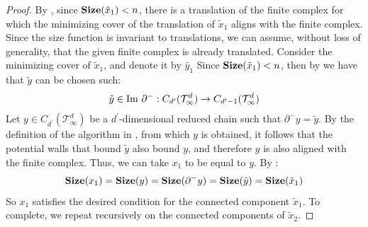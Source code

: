 \begin{proof}
By , since $\mathbf{Size}(\tilde{x}_{1}) < n$, there is a translation of the finite complex for which the minimizing cover of the translation of $\tilde{x}_{1}$ aligns with the finite complex. Since the size function is invariant to translations, we can assume, without loss of generality, that the given finite complex is already translated. Consider the minimizing cover of $\tilde{x}_{1}$, and denote it by $\tilde{y_1}$ Since $\mathbf{Size}(\tilde{x}_{1}) < n$, then by  we have that $\tilde{y}$ can be chosen such:
\begin{equation*}
  \begin{split}
    \tilde{y} \in \text{Im } \partial^{-} : C_{d^{\prime}}(\mathcal T_\infty^d) \rightarrow C_{d^{\prime}-1}(\mathcal T_\infty^d)
  \end{split}
\end{equation*}
Let $y \in C_{d^{\prime}}(\mathcal T_\infty^d) $ be a $d^{\prime}$-dimensional reduced chain such that $\partial^{-}y = \tilde{y}$. By the definition of the algorithm in , from which $y$ is obtained, it follows that the potential walls that bound $\tilde{y}$ also bound $y$, and therefore $y$ is also aligned with the finite complex. Thus, we can take $x_{1}$ to be equal to $y$. By :
\begin{equation*}
  \begin{split}
    \mathbf{Size}(x_{1}) = \mathbf{Size}(y) = \mathbf{Size}(\partial^{-}y) = \mathbf{Size}(\tilde{y}) = \mathbf{Size}(\tilde{x}_{1})
  \end{split}
\end{equation*}
So $x_{1}$ satisfies the desired condition for the connected component $\tilde{x}_{1}$. To complete, we repeat recursively on the connected components of $\tilde{x}_{2}$. 
\end{proof}


